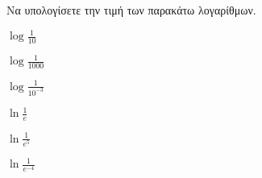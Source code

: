 Να υπολογίσετε την τιμή των παρακάτω λογαρίθμων.
\begin{multicols}{3}
\begin{rlist}
\item $ \log{\frac{1}{10}} $
\item $ \log{\frac{1}{1000}} $
\item $ \log{\frac{1}{10^{-3}}} $
\item $ \ln{\frac{1}{e}} $
\item $ \ln{\frac{1}{e^5}} $
\item $ \ln{\frac{1}{e^{-4}}} $
\end{rlist}
\end{multicols}
